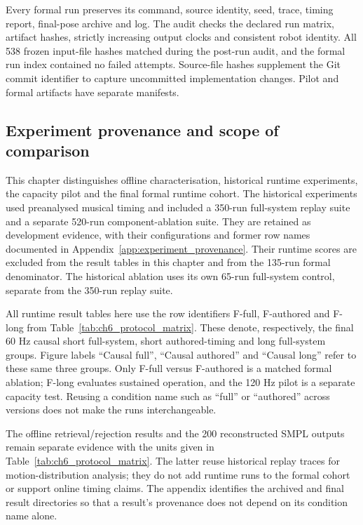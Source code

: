 Every formal run preserves its command, source identity, seed, trace,
timing report, final-pose archive and log. The audit checks the declared run
matrix, artifact hashes, strictly increasing output clocks and consistent robot
identity. All 538 frozen input-file hashes matched during the post-run audit,
and the formal run index contained no failed attempts. Source-file hashes
supplement the Git commit identifier to capture uncommitted implementation
changes. Pilot and formal artifacts have separate manifests.

\subsection{Experiment provenance and scope of comparison}

This chapter distinguishes offline characterisation, historical runtime
experiments, the capacity pilot and the final formal runtime cohort.
The historical experiments used preanalysed musical timing and included a
350-run full-system replay suite and a separate 520-run component-ablation
suite. They are retained as development evidence, with their configurations
and former row names documented in Appendix~\ref{app:experiment_provenance}.
Their runtime scores are excluded from the result tables in this chapter and
from the 135-run formal denominator. The historical ablation uses its own
65-run full-system control, separate from the 350-run replay suite.

All runtime result tables here use the row identifiers F-full, F-authored and
F-long from Table~\ref{tab:ch6_protocol_matrix}. These denote, respectively,
the final 60 Hz causal short full-system, short authored-timing and long
full-system groups. Figure labels ``Causal full'', ``Causal authored'' and
``Causal long'' refer to these same three groups. Only F-full versus F-authored
is a matched formal ablation; F-long evaluates sustained operation, and the
120 Hz pilot is a separate capacity test. Reusing a condition name such as
``full'' or ``authored'' across versions does not make the runs interchangeable.

The offline retrieval/rejection results and the 200 reconstructed SMPL outputs
remain separate evidence with the units given in Table~\ref{tab:ch6_protocol_matrix}.
The latter reuse historical replay traces for motion-distribution analysis;
they do not add runtime runs to the formal cohort or support online timing
claims. The appendix identifies the archived and final result directories so
that a result's provenance does not depend on its condition name alone.

